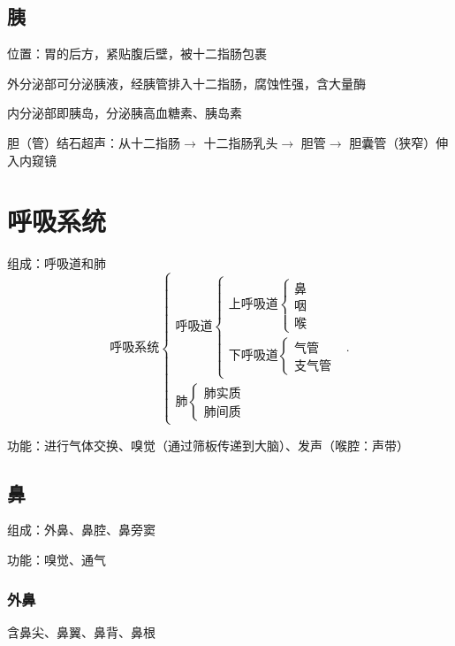 \subsection{胰}%
\label{sub:胰}
位置：胃的后方，紧贴腹后壁，被十二指肠包裹

外分泌部可分泌胰液，经胰管排入十二指肠，腐蚀性强，含大量酶

内分泌部即胰岛，分泌胰高血糖素、胰岛素
\begin{notation}
    胆（管）结石超声：从十二指肠$\to $ 十二指肠乳头$\to $ 胆管$\to $ 胆囊管（狭窄）伸入内窥镜
\end{notation}
\section{呼吸系统}%
\label{sec:呼吸系统}
组成：呼吸道和肺
\[
    \text{呼吸系统}\begin{cases}
        \text{呼吸道}\begin{cases}
            \text{上呼吸道}\begin{cases}
                \text{鼻}\\
                \text{咽}\\
                \text{喉}
            \end{cases}\\
            \text{下呼吸道}\begin{cases}
                \text{气管}\\
                \text{支气管}
            \end{cases}
        \end{cases}\\
        \text{肺}\begin{cases}
            \text{肺实质}\\
            \text{肺间质}
        \end{cases}
    \end{cases}
.\] 

功能：进行气体交换、嗅觉（通过筛板传递到大脑）、发声（喉腔：声带）
\subsection{鼻}%
\label{sub:鼻}
组成：外鼻、鼻腔、鼻旁窦

功能：嗅觉、通气
\subsubsection*{外鼻}%
\label{subsub:外鼻}
含鼻尖、鼻翼、鼻背、鼻根

